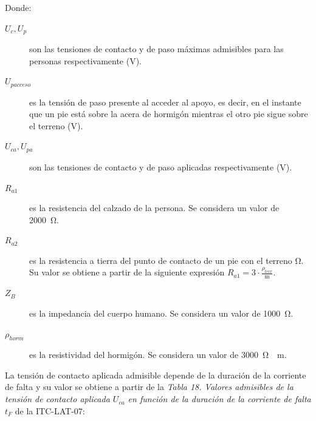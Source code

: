 Donde:
\begin{description}
    \item[$U_c,U_p$] son las tensiones de contacto y de paso máximas admisibles para las personas respectivamente (\si{\volt}).
    \item[$U_{pacceso}$] es la tensión de paso presente al acceder al apoyo, es decir, en el instante que un pie está sobre la acera de hormigón mientras el otro pie sigue sobre el terreno (\si{\volt}).
    \item[$U_{ca},U_{pa}$] son las tensiones de contacto y de paso aplicadas respectivamente (\si{\volt}).
    \item[$R_{a1}$] es la resistencia del calzado de la persona. Se considera un valor de \SI{2000}{\ohm}.
    \item[$R_{a2}$] es la resistencia a tierra del punto de contacto de un pie con el terreno \si{\ohm}. Su valor se obtiene a partir de la siguiente expresión $R_{a1}=3\cdot\frac{\rho_{terr}}{\si{\meter}}$.
    \item[$Z_B$] es la impedancia del cuerpo humano. Se considera un valor de \SI{1000}{\ohm}.
    \item[$\rho_{horm}$] es la resistividad del hormigón. Se considera un valor de \SI{3000}{\ohm\cdot\meter}.
\end{description}

La tensión de contacto aplicada admisible depende de la duración de la corriente de falta y su valor se obtiene a partir de la \textit{Tabla 18. Valores admisibles de la tensión de contacto aplicada $U_{ca}$ en función de la duración de la corriente de falta $t_F$} de la ITC-LAT-07:

